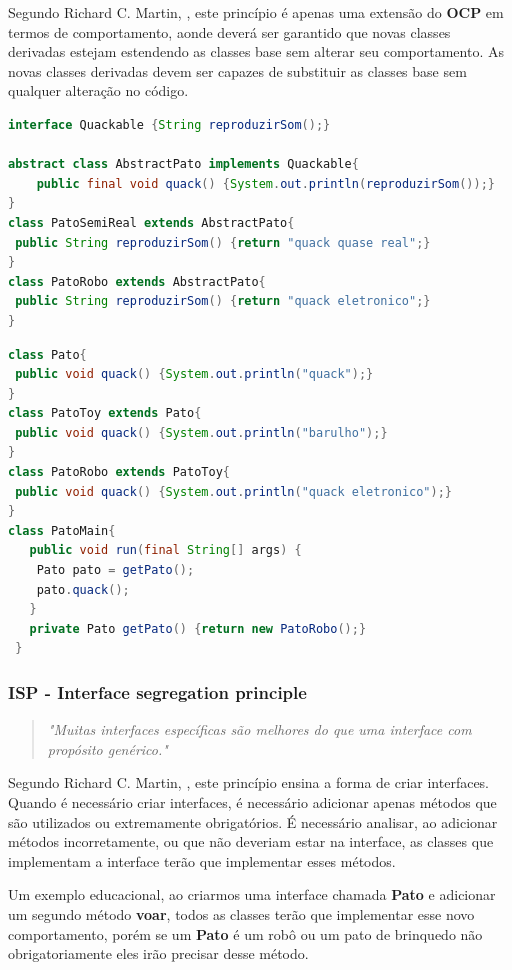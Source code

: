 \documentclass[12pt]{article}
\begin{document}
Segundo Richard C. Martin, \cite{ROBERT_MARTIN_THE_CLEAN_ARCHITECTURE}, este princípio é apenas uma extensão do \textbf{OCP} em termos de comportamento, aonde deverá ser garantido que novas classes derivadas estejam estendendo as classes base sem alterar seu comportamento. As novas classes derivadas devem ser capazes de substituir as classes base sem qualquer alteração no código.

\begin{lstlisting}[caption=Exemplo em conformidade ao LSP,language=java]
interface Quackable {String reproduzirSom();}

abstract class AbstractPato implements Quackable{
    public final void quack() {System.out.println(reproduzirSom());}
}
class PatoSemiReal extends AbstractPato{
 public String reproduzirSom() {return "quack quase real";}
}
class PatoRobo extends AbstractPato{
 public String reproduzirSom() {return "quack eletronico";}
}
\end{lstlisting}

\begin{lstlisting}[caption=Exemplo de violação ao LSP,language=java]
class Pato{
 public void quack() {System.out.println("quack");}
}
class PatoToy extends Pato{
 public void quack() {System.out.println("barulho");}
}
class PatoRobo extends PatoToy{
 public void quack() {System.out.println("quack eletronico");}
}
class PatoMain{
   public void run(final String[] args) {
    Pato pato = getPato();
    pato.quack();
   }
   private Pato getPato() {return new PatoRobo();}
 }
\end{lstlisting}

\subsubsection{ISP - Interface segregation principle}
\begin{quote}
	\textit{"Muitas interfaces específicas são melhores do que uma interface com propósito genérico."}	
\end{quote}

Segundo Richard C. Martin, \cite{ROBERT_MARTIN_THE_CLEAN_ARCHITECTURE}, este princípio ensina a forma de criar interfaces. Quando é necessário criar interfaces, é necessário adicionar apenas métodos que são utilizados ou extremamente obrigatórios. É necessário analisar, ao adicionar métodos incorretamente, ou que não deveriam estar na interface, as classes que implementam a interface terão que implementar esses métodos. 

Um exemplo educacional, ao criarmos uma interface chamada \textbf{Pato} e adicionar um segundo método \textbf{voar}, todos as classes terão que implementar esse novo comportamento, porém se um \textbf{Pato} é um robô ou um pato de brinquedo não obrigatoriamente eles irão precisar desse método.
\end{document}
